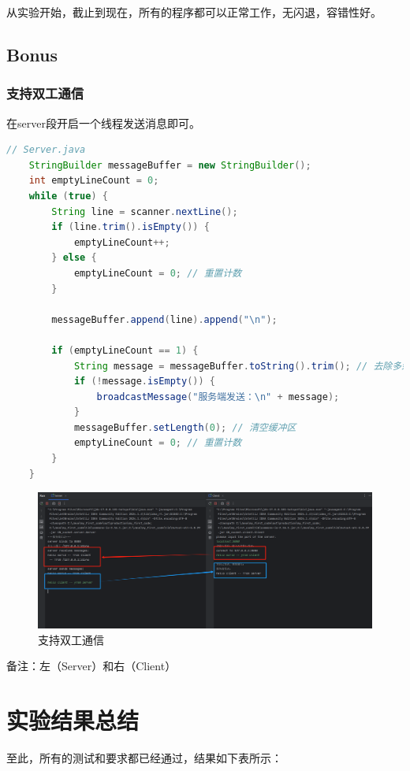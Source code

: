 \documentclass{article}
\begin{document}
	从实验开始，截止到现在，所有的程序都可以正常工作，无闪退，容错性好。
	
	\subsection{Bonus}
	
	\subsubsection{支持双工通信}
	
	在server段开启一个线程发送消息即可。
	
	\begin{lstlisting}[language=Java, title=支持双工通信, tabsize=4]
	// Server.java
	StringBuilder messageBuffer = new StringBuilder();
	int emptyLineCount = 0;
	while (true) {
		String line = scanner.nextLine();
		if (line.trim().isEmpty()) {
			emptyLineCount++;
		} else {
			emptyLineCount = 0; // 重置计数
		}
		
		messageBuffer.append(line).append("\n");
		
		if (emptyLineCount == 1) {
			String message = messageBuffer.toString().trim(); // 去除多余的换行
			if (!message.isEmpty()) {
				broadcastMessage("服务端发送：\n" + message);
			}
			messageBuffer.setLength(0); // 清空缓冲区
			emptyLineCount = 0; // 重置计数
		}
	}
	\end{lstlisting}
	
	\begin{figure}[H]
		\centering
		\includegraphics[width=15cm]{./images/9.支持双工通信.png}
		\caption{支持双工通信}
	\end{figure}
	
	备注：左（Server）和右（Client）
	
	\section{实验结果总结}
	
	至此，所有的测试和要求都已经通过，结果如下表所示：
	
\end{document}
